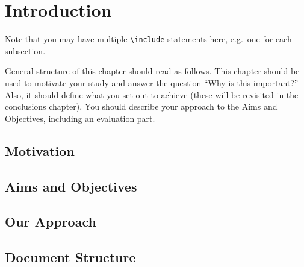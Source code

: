 \chapter{Introduction}

Note that you may have multiple \texttt{{\textbackslash}include} statements here, e.g.\ one for each subsection.

General structure of this chapter should read as follows.
This chapter should be used to motivate your study and answer the question ``Why is this important?''
Also, it should define what you set out to achieve (these will be revisited in the conclusions chapter).
You should describe your approach to the Aims and Objectives, including an evaluation part.

\section{Motivation} %
\blindtext

\section{Aims and Objectives}
\blindtext

\section{Our Approach}
\blindtext

\section{Document Structure}
\blindtext
